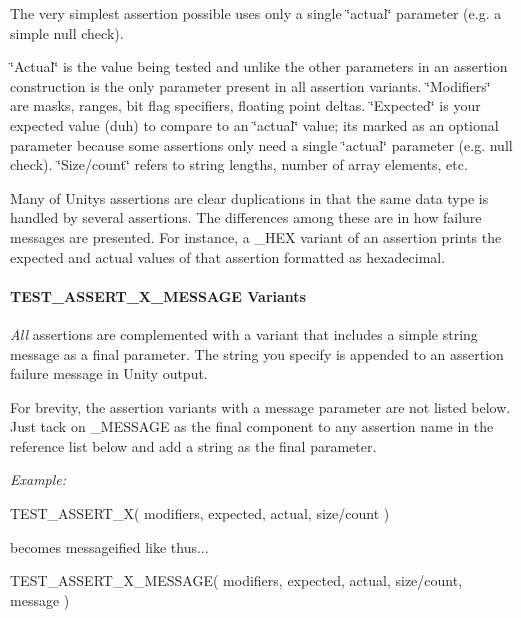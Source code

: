 The very simplest assertion possible uses only a single \char`\"{}actual\char`\"{} parameter (e.\+g. a simple null check).

\char`\"{}\+Actual\char`\"{} is the value being tested and unlike the other parameters in an assertion construction is the only parameter present in all assertion variants. \char`\"{}\+Modifiers\char`\"{} are masks, ranges, bit flag specifiers, floating point deltas. \char`\"{}\+Expected\char`\"{} is your expected value (duh) to compare to an \char`\"{}actual\char`\"{} value; it\textquotesingle{}s marked as an optional parameter because some assertions only need a single \char`\"{}actual\char`\"{} parameter (e.\+g. null check). \char`\"{}\+Size/count\char`\"{} refers to string lengths, number of array elements, etc.

Many of Unity\textquotesingle{}s assertions are clear duplications in that the same data type is handled by several assertions. The differences among these are in how failure messages are presented. For instance, a {\ttfamily \+\_\+\+H\+EX} variant of an assertion prints the expected and actual values of that assertion formatted as hexadecimal.

\paragraph*{T\+E\+S\+T\+\_\+\+A\+S\+S\+E\+R\+T\+\_\+\+X\+\_\+\+M\+E\+S\+S\+A\+GE Variants}

{\itshape All} assertions are complemented with a variant that includes a simple string message as a final parameter. The string you specify is appended to an assertion failure message in Unity output.

For brevity, the assertion variants with a message parameter are not listed below. Just tack on {\ttfamily \+\_\+\+M\+E\+S\+S\+A\+GE} as the final component to any assertion name in the reference list below and add a string as the final parameter.

{\itshape Example\+:} \begin{DoxyVerb}TEST_ASSERT_X( {modifiers}, {expected}, actual, {size/count} )
\end{DoxyVerb}


becomes messageified like thus... \begin{DoxyVerb}TEST_ASSERT_X_MESSAGE( {modifiers}, {expected}, actual, {size/count}, message )
\end{DoxyVerb}


